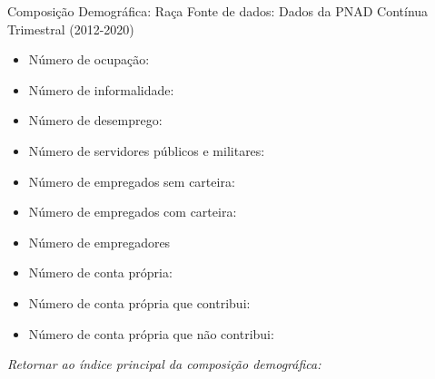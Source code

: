 \begin{frame}[label=_composicao_demografica_raca]{Composição Demográfica: Raça}
{\footnotesize Fonte de dados: Dados da PNAD Contínua Trimestral (2012-2020)}
\begin{itemize}
\item{Número de ocupação: \hyperlink{_composicao_demografica_raca_n_de_ocupacao}{}}
\item{Número de informalidade: \hyperlink{_composicao_demografica_raca_n_de_informalidade}{}}
\item{Número de desemprego: \hyperlink{_composicao_demografica_raca_n_de_desemprego}{}}
\item{Número de servidores públicos e militares: \hyperlink{_composicao_demografica_raca_n_militar}{}}
\item{Número de empregados sem carteira: \hyperlink{_composicao_demografica_raca_n_empregadoSC}{}}
\item{Número de empregados com carteira: \hyperlink{_composicao_demografica_raca_n_empregadoCC}{}}
\item{Número de empregadores \hyperlink{_composicao_demografica_raca_n_empregador}{}}
\item{Número de conta própria: \hyperlink{_composicao_demografica_raca_n_cpropria}{}}
\item{Número de conta própria que contribui: \hyperlink{_composicao_demografica_raca_n_cpropriaC}{}}
\item{Número de conta própria que não contribui: \hyperlink{_composicao_demografica_raca_n_cpropriaNc}{}}
\end{itemize}

\begin{small}
\textit{Retornar ao índice principal da composição demográfica: \hyperlink{_composicao_demografica}{} }
\end{small}

\end{frame}

